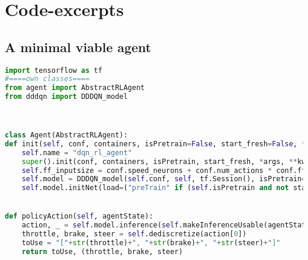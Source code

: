 


\chapter{Code-excerpts}


\section{A minimal viable agent} %

\label{AppendixD} %

\begin{lstlisting}[language=Python, frame=none]
import tensorflow as tf
#====own classes====
from agent import AbstractRLAgent
from dddqn import DDDQN_model 



class Agent(AbstractRLAgent):    
def init(self, conf, containers, isPretrain=False, start_fresh=False, *args, **kwargs):
	self.name = "dqn_rl_agent"
	super().init(conf, containers, isPretrain, start_fresh, *args, **kwargs)
	self.ff_inputsize = conf.speed_neurons + conf.num_actions * conf.ff_stacksize #32
	self.model = DDDQN_model(self.conf, self, tf.Session(), isPretrain=isPretrain)
	self.model.initNet(load=("preTrain" if (self.isPretrain and not start_fresh) else (not start_fresh)))


def policyAction(self, agentState):
	action, _ = self.model.inference(self.makeInferenceUsable(agentState)) 
	throttle, brake, steer = self.dediscretize(action[0])
	toUse = "["+str(throttle)+", "+str(brake)+", "+str(steer)+"]"
	return toUse, (throttle, brake, steer)
\end{lstlisting}%

\vspace*{2cm}
